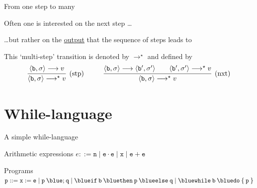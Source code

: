\documentclass{beamer}
\begin{document}
\begin{frame}{From one step to many}
        
        Often one is interested on the next step \dots

        \dots but rather on the \alert{\underline{output}} that the sequence of
        steps leads to

        \pause
        \bigskip
        \bigskip
        This `multi-step' transition is denoted by $\longrightarrow^\star$
        and defined by 
        \[
                \infer[\text{(stp)}]{ 
                        \pv{\prog{b}}{\sigma} \longrightarrow^\star v 
                }{
                        \pv{\prog{b}}{\sigma} \longrightarrow v 
                }
                \hspace{1cm}
                \infer[\text{(nxt)}]{ 
                        \pv{\prog{b}}{\sigma} \longrightarrow^\star v 
                }{
                        \pv{\prog{b}}{\sigma} \longrightarrow 
                        \pv{\prog{b'}}{\sigma'} 
                        \qquad
                        \pv{\prog{b'}}{\sigma'} \longrightarrow^\star v
                }
        \]
\end{frame}
\section{While-language}

\begin{frame}{A simple while-language}

        \vspace{0.7cm}
	\begin{block}{Arithmetic expressions}
	$e ::=  \mathtt{n}  \mid \mathtt{e \cdot e}
        \mid  \mathtt{x}  \mid \mathtt{e + e}$
	\end{block}

	\vspace{0.7cm}
	\begin{block}{Programs}
        $\prog{p} ::= \mathtt{x} := \mathtt{e} \mid
	\mathtt{p \> {\blue ;} \> q} \mid
	\mathtt{{\blue if} \> b \> {\blue then} \> p \> {\blue else} \> q} \mid
	\mathtt{{\blue while} \> b \> {\blue do} \> \{ \> p \> \}}$
	\end{block}

\end{frame}
\end{document}
